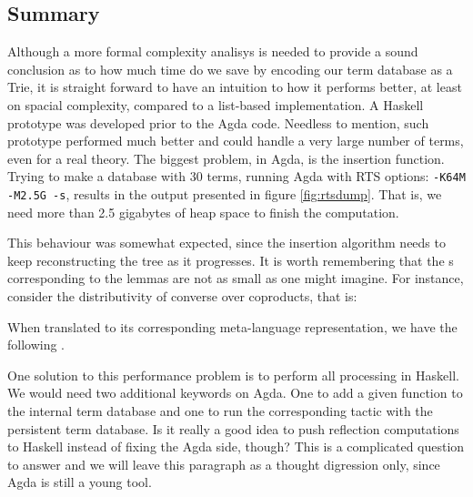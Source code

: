 \subsection{Summary}

Although a more formal complexity analisys is needed to provide a sound conclusion as to
how much time do we save by encoding our term database as a Trie, it is straight forward to have
an intuition to how it performs better, at least on spacial complexity, compared to a list-based
implementation. A Haskell prototype was developed prior to the Agda code. Needless to mention,
such prototype performed much better and could handle a very large number of terms, even for a real theory.
The biggest problem, in Agda, is the insertion function. Trying to make a database with 30 terms,
running Agda with RTS options: \texttt{\small -K64M -M2.5G -s}, results in the output presented
in figure \ref{fig:rtsdump}. That is, we need more than 2.5 gigabytes of heap space to finish
the computation.

This behaviour was somewhat expected, since the insertion algorithm needs to keep
reconstructing the tree as it progresses. It is worth remembering that the s
corresponding to the lemmas are not as small as one might imagine. For instance,
consider the distributivity of converse over coproducts, that is:


When translated to its corresponding meta-language representation, we have the following .


One solution to this performance problem is to perform all processing in Haskell. We would need
two additional keywords on Agda. One to add a given function to the internal term database
and one to run the corresponding  tactic with the persistent term database. Is it really
a good idea to push reflection computations to Haskell instead of fixing the Agda side, though?
This is a complicated question to answer and we will leave this paragraph as a thought
digression only, since Agda is still a young tool.


